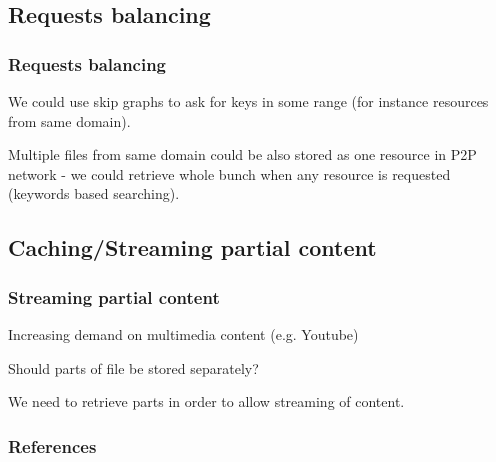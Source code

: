\documentclass{beamer}
\begin{document}
\subsection{Requests balancing}
\begin{frame}
\frametitle{Requests balancing}

\begin{block}{}
We could use skip graphs \cite{aspnes2007skip} to ask for keys in some range 
(for instance resources from same domain). 
\end{block}

\begin{block}{}
Multiple files from same domain could be also stored as one resource
in P2P network - we could retrieve whole bunch when any resource is requested
(keywords based searching).
\end{block}

\end{frame}

\subsection{Caching/Streaming partial content}

\begin{frame}
\frametitle{Streaming partial content}
\begin{block}{}
Increasing demand on multimedia content (e.g. Youtube)
\end{block}

\begin{block}{}
Should parts of file be stored separately?
\end{block}

\begin{block}{}
We need to retrieve parts in order to allow streaming of content.
\end{block}

\end{frame}

\begin{frame}[allowframebreaks]
\frametitle{References}


\end{frame}
\end{document}
